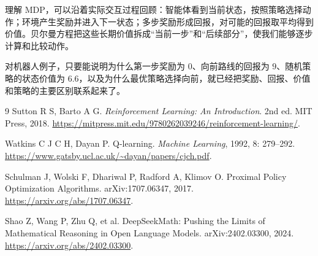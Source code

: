 \documentclass[UTF8,12pt,a4paper,fontset=fandol]{ctexart}
\begin{document}
理解 MDP，可以沿着实际交互过程回顾：智能体看到当前状态，按照策略选择动作；环境产生奖励并进入下一状态；多步奖励形成回报，对可能的回报取平均得到价值。贝尔曼方程把这些长期价值拆成“当前一步”和“后续部分”，使我们能够逐步计算和比较动作。

对机器人例子，只要能说明为什么第一步奖励为 $0$、向前路线的回报为 $9$、随机策略的状态价值为 $6.6$，以及为什么最优策略选择向前，就已经把奖励、回报、价值和策略的主要区别联系起来了。

\begin{thebibliography}{9}
  Sutton R S, Barto A G.
  \textit{Reinforcement Learning: An Introduction}.
  2nd ed. MIT Press, 2018.
  \url{https://mitpress.mit.edu/9780262039246/reinforcement-learning/}.

  Watkins C J C H, Dayan P.
  Q-learning.
  \textit{Machine Learning}, 1992, 8: 279--292.
  \url{https://www.gatsby.ucl.ac.uk/~dayan/papers/cjch.pdf}.

  Schulman J, Wolski F, Dhariwal P, Radford A, Klimov O.
  Proximal Policy Optimization Algorithms.
  arXiv:1707.06347, 2017.
  \url{https://arxiv.org/abs/1707.06347}.

  Shao Z, Wang P, Zhu Q, et al.
  DeepSeekMath: Pushing the Limits of Mathematical Reasoning in Open Language Models.
  arXiv:2402.03300, 2024.
  \url{https://arxiv.org/abs/2402.03300}.
\end{thebibliography}
\end{document}
